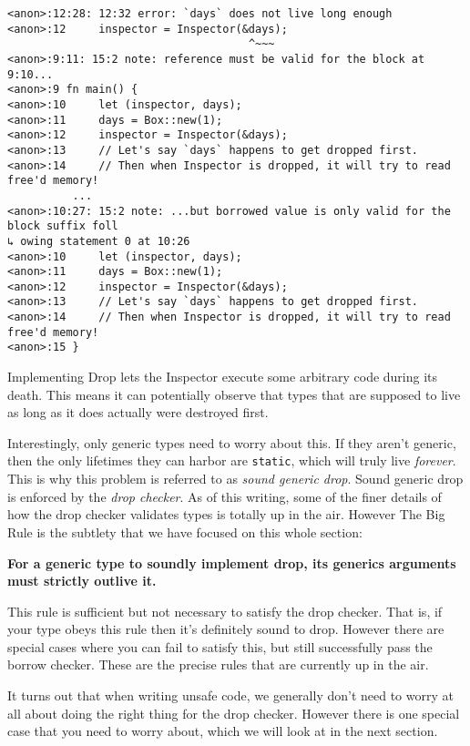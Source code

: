 \documentclass[a4paper,]{book}
\begin{document}
\begin{verbatim}
<anon>:12:28: 12:32 error: `days` does not live long enough
<anon>:12     inspector = Inspector(&days);
                                     ^~~~
<anon>:9:11: 15:2 note: reference must be valid for the block at 9:10...
<anon>:9 fn main() {
<anon>:10     let (inspector, days);
<anon>:11     days = Box::new(1);
<anon>:12     inspector = Inspector(&days);
<anon>:13     // Let's say `days` happens to get dropped first.
<anon>:14     // Then when Inspector is dropped, it will try to read free'd memory!
          ...
<anon>:10:27: 15:2 note: ...but borrowed value is only valid for the block suffix foll
↳ owing statement 0 at 10:26
<anon>:10     let (inspector, days);
<anon>:11     days = Box::new(1);
<anon>:12     inspector = Inspector(&days);
<anon>:13     // Let's say `days` happens to get dropped first.
<anon>:14     // Then when Inspector is dropped, it will try to read free'd memory!
<anon>:15 }
\end{verbatim}

Implementing Drop lets the Inspector execute some arbitrary code during
its death. This means it can potentially observe that types that are
supposed to live as long as it does actually were destroyed first.

Interestingly, only generic types need to worry about this. If they
aren't generic, then the only lifetimes they can harbor are
\texttt{\textquotesingle{}static}, which will truly live \emph{forever}.
This is why this problem is referred to as \emph{sound generic drop}.
Sound generic drop is enforced by the \emph{drop checker}. As of this
writing, some of the finer details of how the drop checker validates
types is totally up in the air. However The Big Rule is the subtlety
that we have focused on this whole section:

\textbf{For a generic type to soundly implement drop, its generics
arguments must strictly outlive it.}

This rule is sufficient but not necessary to satisfy the drop checker.
That is, if your type obeys this rule then it's definitely sound to
drop. However there are special cases where you can fail to satisfy
this, but still successfully pass the borrow checker. These are the
precise rules that are currently up in the air.

It turns out that when writing unsafe code, we generally don't need to
worry at all about doing the right thing for the drop checker. However
there is one special case that you need to worry about, which we will
look at in the next section.
\end{document}
